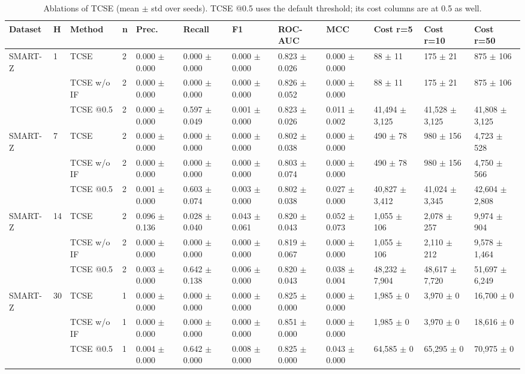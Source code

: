 \begin{table}[t]
\centering
\caption{Ablations of TCSE (mean $\pm$ std over seeds). TCSE @0.5 uses the default threshold; its cost columns are at 0.5 as well.}
\label{tab:table3_ablation}
\footnotesize
\begin{tabular}{llllllllllll}
\toprule
Dataset & H & Method & n & Prec. & Recall & F1 & ROC-AUC & MCC & Cost r=5 & Cost r=10 & Cost r=50 \\
\midrule
SMART-Z & 1 & TCSE & 2 & 0.000 $\pm$ 0.000 & 0.000 $\pm$ 0.000 & 0.000 $\pm$ 0.000 & 0.823 $\pm$ 0.026 & 0.000 $\pm$ 0.000 & 88 $\pm$ 11 & 175 $\pm$ 21 & 875 $\pm$ 106 \\
 &  & TCSE w/o IF & 2 & 0.000 $\pm$ 0.000 & 0.000 $\pm$ 0.000 & 0.000 $\pm$ 0.000 & 0.826 $\pm$ 0.052 & 0.000 $\pm$ 0.000 & 88 $\pm$ 11 & 175 $\pm$ 21 & 875 $\pm$ 106 \\
 &  & TCSE @0.5 & 2 & 0.000 $\pm$ 0.000 & 0.597 $\pm$ 0.049 & 0.001 $\pm$ 0.000 & 0.823 $\pm$ 0.026 & 0.011 $\pm$ 0.002 & 41,494 $\pm$ 3,125 & 41,528 $\pm$ 3,125 & 41,808 $\pm$ 3,125 \\
SMART-Z & 7 & TCSE & 2 & 0.000 $\pm$ 0.000 & 0.000 $\pm$ 0.000 & 0.000 $\pm$ 0.000 & 0.802 $\pm$ 0.038 & 0.000 $\pm$ 0.000 & 490 $\pm$ 78 & 980 $\pm$ 156 & 4,723 $\pm$ 528 \\
 &  & TCSE w/o IF & 2 & 0.000 $\pm$ 0.000 & 0.000 $\pm$ 0.000 & 0.000 $\pm$ 0.000 & 0.803 $\pm$ 0.074 & 0.000 $\pm$ 0.000 & 490 $\pm$ 78 & 980 $\pm$ 156 & 4,750 $\pm$ 566 \\
 &  & TCSE @0.5 & 2 & 0.001 $\pm$ 0.000 & 0.603 $\pm$ 0.074 & 0.003 $\pm$ 0.000 & 0.802 $\pm$ 0.038 & 0.027 $\pm$ 0.000 & 40,827 $\pm$ 3,412 & 41,024 $\pm$ 3,345 & 42,604 $\pm$ 2,808 \\
SMART-Z & 14 & TCSE & 2 & 0.096 $\pm$ 0.136 & 0.028 $\pm$ 0.040 & 0.043 $\pm$ 0.061 & 0.820 $\pm$ 0.043 & 0.052 $\pm$ 0.073 & 1,055 $\pm$ 106 & 2,078 $\pm$ 257 & 9,974 $\pm$ 904 \\
 &  & TCSE w/o IF & 2 & 0.000 $\pm$ 0.000 & 0.000 $\pm$ 0.000 & 0.000 $\pm$ 0.000 & 0.819 $\pm$ 0.067 & 0.000 $\pm$ 0.000 & 1,055 $\pm$ 106 & 2,110 $\pm$ 212 & 9,578 $\pm$ 1,464 \\
 &  & TCSE @0.5 & 2 & 0.003 $\pm$ 0.000 & 0.642 $\pm$ 0.138 & 0.006 $\pm$ 0.000 & 0.820 $\pm$ 0.043 & 0.038 $\pm$ 0.004 & 48,232 $\pm$ 7,904 & 48,617 $\pm$ 7,720 & 51,697 $\pm$ 6,249 \\
SMART-Z & 30 & TCSE & 1 & 0.000 $\pm$ 0.000 & 0.000 $\pm$ 0.000 & 0.000 $\pm$ 0.000 & 0.825 $\pm$ 0.000 & 0.000 $\pm$ 0.000 & 1,985 $\pm$ 0 & 3,970 $\pm$ 0 & 16,700 $\pm$ 0 \\
 &  & TCSE w/o IF & 1 & 0.000 $\pm$ 0.000 & 0.000 $\pm$ 0.000 & 0.000 $\pm$ 0.000 & 0.851 $\pm$ 0.000 & 0.000 $\pm$ 0.000 & 1,985 $\pm$ 0 & 3,970 $\pm$ 0 & 18,616 $\pm$ 0 \\
 &  & TCSE @0.5 & 1 & 0.004 $\pm$ 0.000 & 0.642 $\pm$ 0.000 & 0.008 $\pm$ 0.000 & 0.825 $\pm$ 0.000 & 0.043 $\pm$ 0.000 & 64,585 $\pm$ 0 & 65,295 $\pm$ 0 & 70,975 $\pm$ 0 \\
\bottomrule
\end{tabular}
\end{table}
